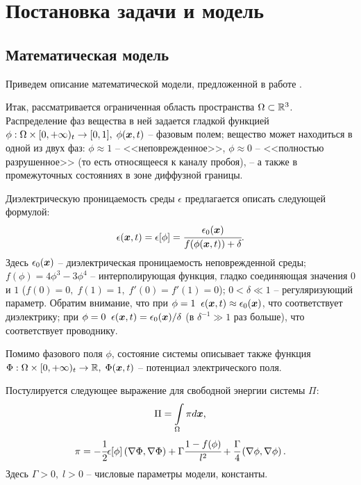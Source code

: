 
\section{Постановка задачи и модель}

\subsection{Математическая модель}

Приведем описание математической модели, предложенной в работе \cite{pitike_dielectric_breakdown}.

Итак, рассматривается ограниченная область пространства $\Omega \subset {\mathbb{R}}^3$. Распределение фаз вещества в ней задается гладкой функцией $\phi: \Omega \times [0, +\infty)_t \to [0, 1], \; \phi({\boldsymbol{x}}, t)$ -- фазовым полем; вещество может находиться в одной из двух фаз: $\phi \approx 1$ -- <<неповрежденное>>, $\phi \approx 0$ -- <<полностью разрушенное>> (то есть относящееся к каналу пробоя), -- а также в промежуточных состояниях в зоне диффузной границы.

Диэлектрическую проницаемость среды $\epsilon$ предлагается описать следующей формулой:
\begin{equation}
	\epsilon({\boldsymbol{x}}, t) = \epsilon[\phi] = \cfrac{\epsilon_0({\boldsymbol{x}})}{f(\phi({\boldsymbol{x}}, t)) + \delta} {\text{.}}
	\label{eq:epsilon}
\end{equation}
Здесь $\epsilon_0({\boldsymbol{x}})$ -- диэлектрическая проницаемость неповрежденной среды; $f(\phi) = 4\phi^3 - 3\phi^4$ -- интерполирующая функция, гладко соединяющая значения $0$ и $1$ ($f(0) = 0, \; f(1) = 1, \; f'(0) = f'(1) = 0$); $0 < \delta \ll 1$ -- регуляризующий параметр. Обратим внимание, что при $\phi = 1 \;\; \epsilon({\boldsymbol{x}}, t) \approx \epsilon_0({\boldsymbol{x}})$, что соответствует диэлектрику; при $\phi = 0 \;\; \epsilon({\boldsymbol{x}}, t) = \epsilon_0({\boldsymbol{x}}) / \delta$ (в $\delta^{-1} \gg 1$ раз больше), что соответствует проводнику.

Помимо фазового поля $\phi$, состояние системы описывает также функция $\Phi: \Omega \times [0, +\infty)_t \to {\mathbb{R}}, \; \Phi({\boldsymbol{x}}, t)$ -- потенциал электрического поля.

Постулируется следующее выражение для свободной энергии системы $\Pi$:
\begin{equation}
	\Pi = \int \limits_\Omega \pi d {\boldsymbol{x}} {\text{,}}
	\label{eq:energy}
\end{equation}
\begin{equation}
	\pi = -\cfrac{1}{2} \epsilon[\phi] \left( \nabla \Phi, \nabla \Phi \right) + \Gamma \cfrac{1 - f(\phi)}{l^2} + \cfrac{\Gamma}{4} \left( \nabla \phi, \nabla \phi \right) {\text{.}}
	\label{eq:energy_density}
\end{equation}
Здесь $\Gamma > 0, \; l > 0$ -- числовые параметры модели, константы.

